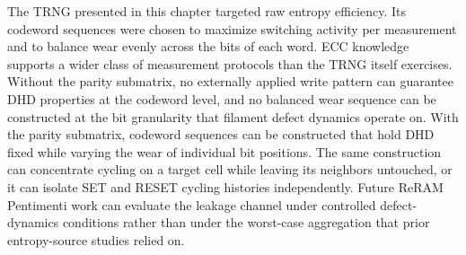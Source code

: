 The TRNG presented in this chapter targeted raw entropy efficiency. Its
codeword sequences were chosen to maximize switching activity per
measurement and to balance wear evenly across the bits of each word. ECC
knowledge supports a wider class of measurement protocols than the TRNG
itself exercises. Without the parity submatrix, no externally applied
write pattern can guarantee DHD properties at the codeword level, and no
balanced wear sequence can be constructed at the bit granularity that
filament defect dynamics operate on. With the parity submatrix, codeword
sequences can be constructed that hold DHD fixed while varying the wear
of individual bit positions. The same construction can concentrate
cycling on a target cell while leaving its neighbors untouched, or it
can isolate SET and RESET cycling histories independently. Future ReRAM
Pentimenti work can evaluate the leakage channel under controlled
defect-dynamics conditions rather than under the worst-case aggregation
that prior entropy-source studies relied on.
